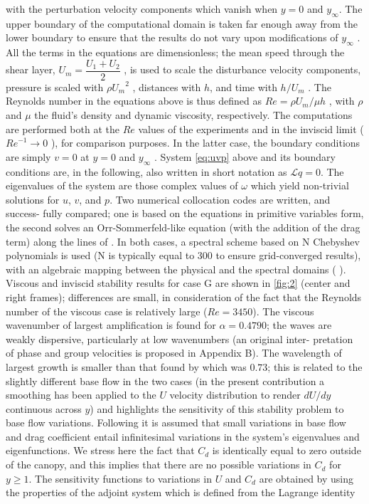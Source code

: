 with the perturbation velocity components which vanish when $y=0$ and $y_{\infty}$. The upper boundary
of the computational domain is taken far enough away from the lower boundary to ensure that the
results do not vary upon modifications of $y_{\infty}$ . All the terms in the equations are dimensionless; the
mean speed through the shear layer, $U_m = \dfrac{U_1 +U_2}{2}$ , is used to scale the disturbance velocity components, pressure is scaled with
$\rho {U_m}^2$ , distances with $h$, and time with $h/U_m$ . The Reynolds number
in the equations above is thus defined as $Re = \rho U_m/ \mu h$ , with $\rho$ and $\mu$ the fluid’s density and dynamic
viscosity, respectively. The computations are performed both at the $Re$ values of the experiments
and in the inviscid limit (${Re}^{-1}  \rightarrow 0$ ), for comparison purposes. In the latter case, the boundary
conditions are simply $v = 0$ at $y = 0$ and $y_{\infty}$ .
System \ref{eq:uvp} above and its boundary conditions are, in the following, also written in short
notation as $\mathscr{L} q = 0$. The eigenvalues of the system are those complex values of $\omega$ which yield
non-trivial solutions for $u$, $v$, and $p$. Two numerical collocation codes are written, and success-
fully compared; one is based on the equations in primitive variables form, the second solves an
Orr-Sommerfeld-like equation (with the addition of the drag term) along the lines of \citet{singh2016linear}.
In both cases, a spectral scheme based on N Chebyshev polynomials is used (N is typically equal
to 300 to ensure grid-converged results), with an algebraic mapping between the physical and the
spectral domains (\citet{hussaini1987spectral} ).
Viscous and inviscid stability results for case G are shown in \ref{fig:2} (center and right frames);
differences are small, in consideration of the fact that the Reynolds number of the viscous case
is relatively large ($Re = 3450$). The viscous wavenumber of largest amplification is found for
$\alpha = 0.4790$; the waves are weakly dispersive, particularly at low wavenumbers (an original inter-
pretation of phase and group velocities is proposed in Appendix B). The wavelength of largest
growth is smaller than that found by \citet{zampogna2016instability} which was $0.73$; this is related to the slightly
different base flow in the two cases (in the present contribution a smoothing has been applied to the
$U$ velocity distribution to render $dU/dy$ continuous across $y$) and highlights the sensitivity of this
stability problem to base flow variations.
Following \citet{bottaro2003effect} it is assumed that small variations in base flow and drag coefficient
entail infinitesimal variations in the system’s eigenvalues and eigenfunctions. We stress here the fact
that $C_d$ is identically equal to zero outside of the canopy, and this implies that there are no possible
variations in $C_d$ for $y \geq 1$. The sensitivity functions to variations in $U$ and $C_d$ are obtained by using
the properties of the adjoint system which is defined from the Lagrange identity

